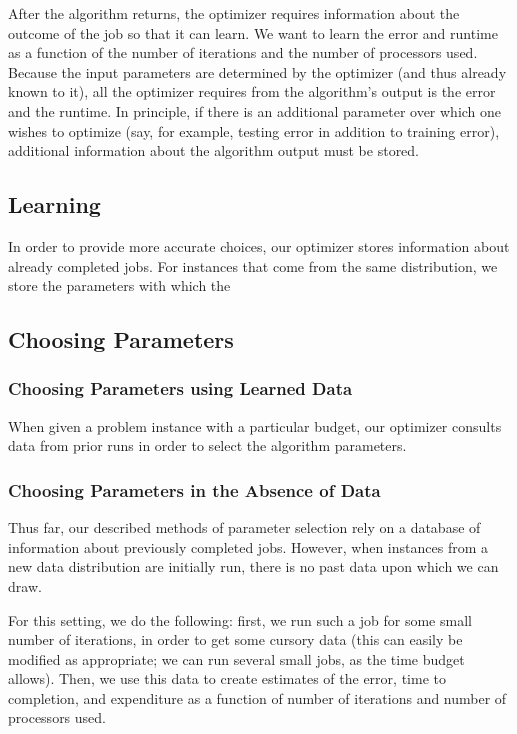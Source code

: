 After the algorithm returns, the optimizer requires information about
the outcome of the job so that it can learn. We want to learn the error
and runtime as a function of the number of iterations and the number
of processors used. Because the input parameters are determined by the
optimizer (and thus already known to it), all the optimizer requires 
from the algorithm's output is the error and the runtime. In principle,
if there is an additional parameter over which one wishes to optimize
(say, for example, testing error in addition to training error),
additional information about the algorithm output must be stored. 

\subsection{Learning}

In order to provide more accurate choices, our optimizer stores information
about already completed jobs. For instances that come from the same distribution, we store the parameters with which the 


\subsection{Choosing Parameters}

\subsubsection{Choosing Parameters using Learned Data}
When given a problem instance with a particular budget, our optimizer
consults data from prior runs in order to select the algorithm 
parameters. 

\subsubsection{Choosing Parameters in the Absence of Data}
\label{sec:nodata}

Thus far, our described methods of parameter selection rely on a database
of information about previously completed jobs. However, when instances
from a new data distribution are initially run, there is no past data upon
which we can draw.

For this setting, we do the following: first, we run such a job for some
small number of iterations, in order to get some cursory data (this can
easily be modified as appropriate; we can run several small jobs, as the 
time budget allows). Then, we use this data to create estimates of the 
error, time to completion, and expenditure as a function of number of 
iterations and number of processors used.

